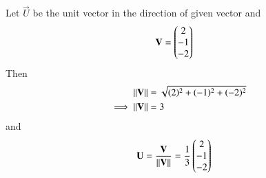Let $\vec{U}$ be the unit vector in the direction of given vector and 
\begin{align}
    \mathbf{V} &= \begin{pmatrix}2\\-1\\-2\end{pmatrix}
\end{align}    
Then
\begin{align}
 \left\lVert\mathbf{V}\right\rVert &= \sqrt{(2)^2 + (-1)^2 + (-2)^2}\\
\implies  \left\lVert\mathbf{V}\right\rVert &= 3
\end{align}
and 
\begin{align}
    \mathbf{U} &= \dfrac{\mathbf{V}}{\left\lVert\mathbf{V}\right\rVert} = \frac{1}{3} \begin{pmatrix}2\\-1\\-2\end{pmatrix}
\end{align}
